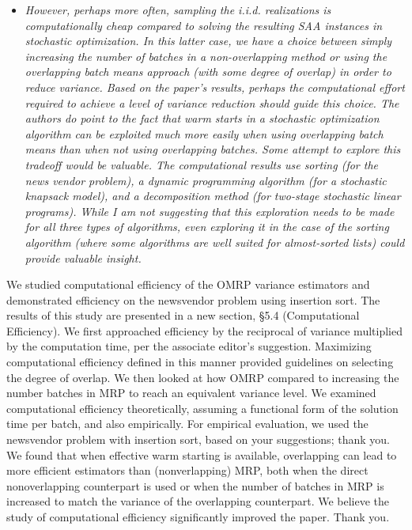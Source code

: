 \documentclass[11pt,notitlepage,onecolumn]{article}
\newcommand{\noi}{\noindent}
\begin{document}
\begin{itemize}
\item[] \textit{However, perhaps more often, sampling the i.i.d. realizations is computationally cheap compared to solving the resulting SAA instances in stochastic optimization. 
In this latter case, we have a choice between simply increasing the number of batches in a non-overlapping method or using the overlapping batch means approach (with some degree of overlap) in order to reduce variance.
Based on the paper's results, perhaps the computational effort required to achieve a level of variance reduction should guide this choice. 
The authors do point to the fact that warm starts in a stochastic
optimization algorithm can be exploited much more easily when using overlapping batch means than when not using overlapping batches. 
Some attempt to explore this tradeoff would be valuable. 
The computational results use sorting (for the news vendor problem), a dynamic programming algorithm (for a stochastic knapsack model), and a decomposition method (for two-stage stochastic linear programs). 
While I am not suggesting that this exploration needs to be made for all three types of algorithms, even exploring it in the case of the sorting algorithm (where some algorithms are well suited for almost-sorted lists) could provide valuable insight.}
\end{itemize}

\noi 
We studied computational efficiency of the OMRP variance estimators and demonstrated efficiency on the newsvendor problem using insertion sort. 
The results of this study are presented in a new section, \S 5.4 (Computational Efficiency).
We first approached efficiency by the reciprocal of variance multiplied by the computation time, per the associate editor's suggestion. 
Maximizing computational efficiency defined in this manner provided guidelines on selecting the degree of overlap. 
We then looked at how OMRP compared to increasing the number batches in MRP to reach an equivalent variance level.
We examined computational efficiency theoretically, assuming a functional form of the solution time per batch, and also empirically. 
For empirical evaluation, we used the newsvendor problem with insertion sort, based on your suggestions; thank you. 
We found that when effective warm starting is available, overlapping can lead to more efficient estimators than (nonverlapping) MRP, both when the direct nonoverlapping counterpart is used or when the number of batches in MRP is increased to match the variance of the overlapping counterpart.  
We believe the study of computational efficiency significantly improved the paper. 
Thank you.\smallskip 
\end{document}
